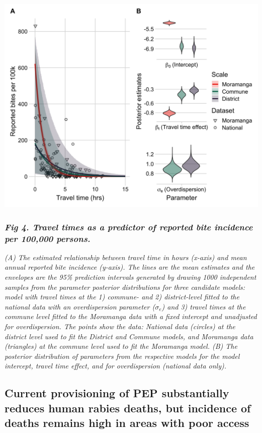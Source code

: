 \documentclass[
]{book}
\begin{document}
\includegraphics[width=0.9\linewidth]{figs/ch2/fig4}

\hypertarget{fig-4.-travel-times-as-a-predictor-of-reported-bite-incidence-per-100000-persons.}{%
\subsubsection{\texorpdfstring{\emph{Fig 4. Travel times as a predictor of reported bite incidence per 100,000 persons.}}{Fig 4. Travel times as a predictor of reported bite incidence per 100,000 persons.}}\label{fig-4.-travel-times-as-a-predictor-of-reported-bite-incidence-per-100000-persons.}}

\emph{(A) The estimated relationship between travel time in hours (x-axis)
and mean annual reported bite incidence (y-axis). The lines are the mean
estimates and the envelopes are the 95\% prediction intervals generated
by drawing 1000 independent samples from the parameter posterior
distributions for three candidate models: model with travel times at the
1) commune- and 2) district-level fitted to the national data with an
overdispersion parameter (}\(\sigma_{e}\)\emph{) and 3) travel times at the
commune level fitted to the Moramanga data with a fixed intercept and
unadjusted for overdispersion. The points show the data: National data
(circles) at the district level used to fit the District and Commune
models, and Moramanga data (triangles) at the commune level used to fit
the Moramanga model. (B) The posterior distribution of parameters from
the respective models for the model intercept, travel time effect, and
for overdispersion (national data only).}

\hypertarget{current-provisioning-of-pep-substantially-reduces-human-rabies-deaths-but-incidence-of-deaths-remains-high-in-areas-with-poor-access}{%
\subsection{Current provisioning of PEP substantially reduces human rabies deaths, but incidence of deaths remains high in areas with poor access}\label{current-provisioning-of-pep-substantially-reduces-human-rabies-deaths-but-incidence-of-deaths-remains-high-in-areas-with-poor-access}}
\end{document}
